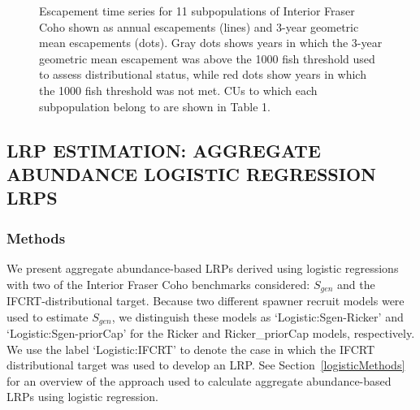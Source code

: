 \documentclass[11pt]{book}
\begin{document}
\begin{figure}[htb]

{\centering {} 

}

\caption{Escapement time series for 11 subpopulations of Interior Fraser Coho shown as annual escapements (lines) and 3-year geometric mean escapements (dots). Gray dots shows years in which the 3-year geometric mean escapement was above the 1000 fish threshold used to assess distributional status, while red dots show years in which the 1000 fish threshold was not met.  CUs to which each subpopulation belong to are shown in Table 1.}\label{fig:coho-Subpop-timeseries}
\end{figure}
\hypertarget{lrp-estimation-aggregate-abundance-logistic-regression-lrps}{%
\subsection{LRP ESTIMATION: AGGREGATE ABUNDANCE LOGISTIC REGRESSION LRPS}\label{lrp-estimation-aggregate-abundance-logistic-regression-lrps}}

\hypertarget{logistic}{%
\subsubsection{Methods}\label{logistic}}

We present aggregate abundance-based LRPs derived using logistic regressions with two of the Interior Fraser Coho benchmarks considered: \(S_{gen}\) and the IFCRT-distributional target. Because two different spawner recruit models were used to estimate \(S_{gen}\), we distinguish these models as `Logistic:Sgen-Ricker' and `Logistic:Sgen-priorCap' for the Ricker and Ricker\_priorCap models, respectively. We use the label `Logistic:IFCRT' to denote the case in which the IFCRT distributional target was used to develop an LRP. See Section~\ref{logisticMethods} for an overview of the approach used to calculate aggregate abundance-based LRPs using logistic regression.
\end{document}
